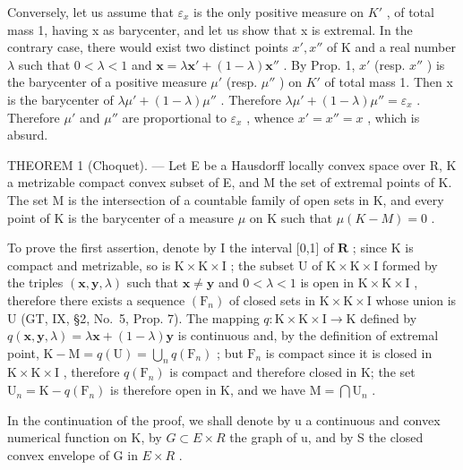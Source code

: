 Conversely, let us assume that \(\varepsilon_{x}\) is the only positive measure on \(K'\) , of total mass 1, having x as barycenter, and let us show that x is extremal. In the contrary case, there would exist two distinct points \(x', x''\) of K and a real number \(\lambda\) such that \(0 < \lambda < 1\) and \(\mathbf{x} = \lambda\mathbf{x}' + (1 - \lambda)\mathbf{x}''\) . By Prop. 1, \(x'\) (resp. \(x''\) ) is the barycenter of a positive measure \(\mu'\) (resp. \(\mu''\) ) on \(K'\) of total mass 1. Then x is the barycenter of \(\lambda\mu' + (1 - \lambda)\mu''\) . Therefore \(\lambda\mu' + (1 - \lambda)\mu'' = \varepsilon_{x}\) . Therefore \(\mu'\) and \(\mu''\) are proportional to \(\varepsilon_{x}\) , whence \(x' = x'' = x\) , which is absurd.

THEOREM 1 (Choquet). --- Let E be a Hausdorff locally convex space over R, K a metrizable compact convex subset of E, and M the set of extremal points of K. The set M is the intersection of a countable family of open sets in K, and every point of K is the barycenter of a measure \(\mu\) on K such that \(\mu(K - M) = 0\) .

To prove the first assertion, denote by I the interval {[}0,1{]} of \(\mathbf{R}\) ; since K is compact and metrizable, so is \(\mathrm{K} \times \mathrm{K} \times \mathrm{I}\) ; the subset U of \(\mathrm{K} \times \mathrm{K} \times \mathrm{I}\) formed by the triples \((\mathbf{x}, \mathbf{y}, \lambda)\) such that \(\mathbf{x} \neq \mathbf{y}\) and \(0 < \lambda < 1\) is open in \(\mathrm{K} \times \mathrm{K} \times \mathrm{I}\) , therefore there exists a sequence \((\mathrm{F}_n)\) of closed sets in \(\mathrm{K} \times \mathrm{K} \times \mathrm{I}\) whose union is U (GT, IX, §2, No.~5, Prop. 7). The mapping \(q: \mathrm{K} \times \mathrm{K} \times \mathrm{I} \to \mathrm{K}\) defined by \(q(\mathbf{x}, \mathbf{y}, \lambda) = \lambda \mathbf{x} + (1 - \lambda) \mathbf{y}\) is continuous and, by the definition of extremal point, \(\mathrm{K} - \mathrm{M} = q(\mathrm{U}) = \bigcup_{n} q(\mathrm{F}_n)\) ; but \(\mathrm{F}_n\) is compact since it is closed in \(\mathrm{K} \times \mathrm{K} \times \mathrm{I}\) , therefore \(q(\mathrm{F}_n)\) is compact and therefore closed in K; the set \(\mathrm{U}_n = \mathrm{K} - q(\mathrm{F}_n)\) is therefore open in K, and we have \(\mathrm{M} = \bigcap \mathrm{U}_n\) .

In the continuation of the proof, we shall denote by u a continuous and convex numerical function on K, by \(G \subset E \times R\) the graph of u, and by S the closed convex envelope of G in \(E \times R\) .

